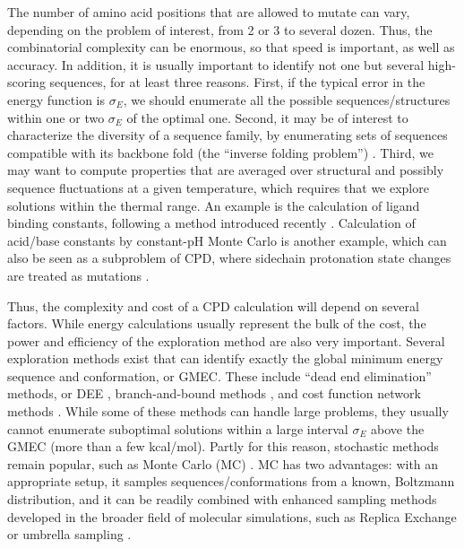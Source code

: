 The number of amino acid positions that are allowed to mutate can vary, depending on the problem of interest,
from 2 or 3 to several dozen. Thus, the combinatorial complexity can be enormous, so that speed is important,
as well as accuracy. In addition, it is usually important to identify not one but several high-scoring sequences,
for at least three reasons. First, if the typical error in the energy function is $\sigma_E$, we should enumerate
all the possible sequences/structures within one or two $\sigma_E$ of the optimal one. Second, it may be of
interest to characterize the diversity of a sequence family, by enumerating sets of sequences compatible with
its backbone fold (the ``inverse folding problem'') \cite{Ponder87,Koehl02,Larson02,Schmidt09,Schmidt10}. Third,
we may want to compute properties that are averaged over structural and possibly sequence fluctuations at a given
temperature, which requires that we explore solutions within the thermal range. An example is the calculation of
ligand binding constants, following a method introduced recently \cite{Druart15}. Calculation of acid/base constants
by constant-pH Monte Carlo is another example, which can also be seen as a  subproblem of CPD, where sidechain
protonation state changes are treated as mutations \cite{Aleksandrov10b,Polydorides13,Kilambi12}.

Thus, the complexity and cost of a CPD calculation will depend on several factors. While energy calculations
usually represent the bulk of the cost, the power and efficiency of the exploration method are also very important.
Several exploration methods exist that can identify exactly the global minimum energy sequence and conformation,
or GMEC. These include ``dead end elimination'' methods, or DEE \cite{Looger01,Georgiev08}, branch-and-bound methods
\cite{Gordon99,Hong09}, and cost function network methods \cite{Traore13,Allouche14}. While some of these methods
can handle large problems, they usually cannot enumerate suboptimal solutions within a large interval $\sigma_E$
above the GMEC (more than a few kcal/mol). Partly for this reason, stochastic methods remain popular, such as Monte
Carlo (MC) \cite{Zou03,Samish11}. MC has two advantages: with an appropriate setup, it samples sequences/conformations
from a known, Boltzmann distribution, and it can be readily combined with enhanced sampling methods developed in the
broader field of molecular simulations, such as Replica Exchange or umbrella sampling \cite{FrenkelBK,ChipotBK}. 

